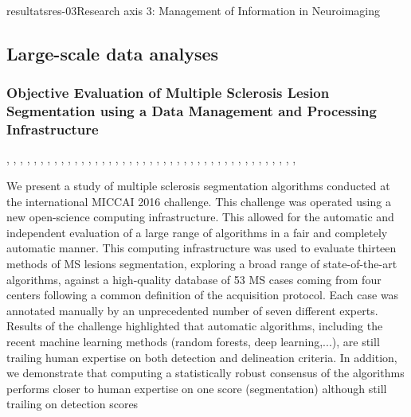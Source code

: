 \documentclass{ra2018}
\begin{document}
\begin{module}{resultats}{res-03}{Research axis 3: Management of Information in Neuroimaging}

\subsection{Large-scale data analyses}
\subsubsection{Objective Evaluation of Multiple Sclerosis Lesion Segmentation using a Data Management and Processing Infrastructure}
\begin{participants}
      ,
      ,
      ,
      ,
      ,
      ,
      ,
      ,
      ,
      ,
      ,
      ,
      ,
      ,
      ,
      ,
      ,
      ,
      ,
      ,
      ,
      ,
      ,
      ,
      ,
      ,
      ,
      ,
      ,
      ,
      ,
      ,
      ,
      ,
      ,
      ,
      ,
      ,
      ,
      ,
      ,
      ,
      ,
\end{participants}
We present a study of multiple sclerosis segmentation algorithms conducted at the international MICCAI 2016 challenge. This challenge was operated using a new open-science computing infrastructure. This allowed for the automatic and independent evaluation of a large range of algorithms in a fair and completely automatic manner. This computing infrastructure was used to evaluate thirteen methods of MS lesions segmentation, exploring a broad range of state-of-the-art algorithms, against a high-quality database of 53 MS cases coming from four centers following a common definition of the acquisition protocol. Each case was annotated manually by an unprecedented number of seven different experts. Results of the challenge highlighted that automatic algorithms, including the recent machine learning methods (random forests, deep learning,...), are still trailing human expertise on both detection and delineation criteria. In addition, we demonstrate that computing a statistically robust consensus of the algorithms performs closer to human expertise on one score (segmentation) although still trailing on detection scores~\cite{commowick:inserm-01847873}


\end{module}
\end{document}
